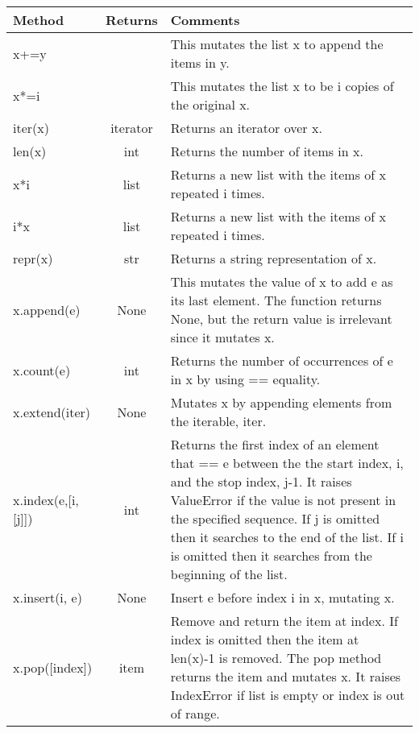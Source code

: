 \begin{center}
{\small
\begin{tabular}{|l|c|p{3in}|} \hline
{\bf Method} & {\bf Returns} & {\bf Comments} \\ \hline\hline 
x+=y & & This mutates the list x to append the items in y. \\ \hline 
x*=i & & This mutates the list x to be i copies of the original x.\\ \hline  
iter(x) & iterator & Returns an iterator over x. \\ \hline 
len(x) & int & Returns the number of items in x.\\ \hline 
x*i & list & Returns a new list with the items of x repeated i times. \\ \hline  
i*x & list & Returns a new list with the items of x repeated i times. \\ \hline  
repr(x) & str & Returns a string representation of x.\\ \hline 

   
       x.append(e) &  None & This mutates the value of x to add e as its last element. The function returns None, but the return value is irrelevant since it mutates x. \\ \hline
   
   
       x.count(e) &int & Returns the number of occurrences of e in x by using == equality. \\ \hline
   
   
       x.extend(iter) & None &  Mutates x by appending elements from the iterable, iter.\\ \hline
   
   
       x.index(e,[i,[j]]) & int & Returns the first index of an element that == e between the the start index, i, and the stop index, j-1.  It raises ValueError if the value is not present in the specified sequence. If j is omitted then it searches to the end of the list. If i is omitted then it searches from the beginning of the list. \\ \hline
   
   
       x.insert(i, e) & None &  Insert e before index i in x, mutating x.\\ \hline
   
   
       x.pop([index]) & item & Remove and return the item at index. If index is omitted then the item at len(x)-1 is removed. The pop method returns the item and mutates x. It raises IndexError if list is empty or index is out of range.\\ \hline
   

\end{tabular}}
\end{center}
